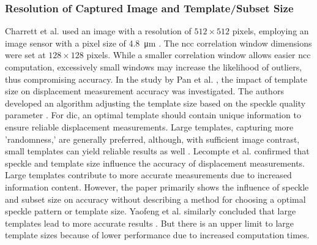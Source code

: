     \subsubsection{Resolution of Captured Image and Template/Subset Size}
    Charrett et al. used an image with a resolution of \(512 \times 512\) pixels, employing an image sensor with a pixel size of \SI{4.8}{\micro\meter} \cite{charrett_2018}. The \gls{ncc} correlation window dimensions were set at \(128 \times 128\) pixels. While a smaller correlation window allows easier \gls{ncc} computation, excessively small windows may increase the likelihood of outliers, thus compromising accuracy. In the study by Pan et al. \cite{pan_subset}, the impact of template size on displacement measurement accuracy was investigated. The authors developed an algorithm adjusting the template size based on the speckle quality parameter . For \gls{dic}, an optimal template should contain unique information to ensure reliable displacement measurements. Large templates, capturing more 'randomness,' are generally preferred, although, with sufficient image contrast, small templates can yield reliable results as well \cite{pan_subset}. Lecompte et al. \cite{lecompte} confirmed that speckle and template size influence the accuracy of displacement measurements. Large templates contribute to more accurate measurements due to increased information content. However, the paper primarily shows the influence of speckle and subset size on accuracy without describing a method for choosing a optimal speckle pattern or template size. Yaofeng et al. similarly concluded that large templates lead to more accurate results \cite{yaofeng}. But there is an upper limit to large template sizes because of lower performance due to increased computation times.

